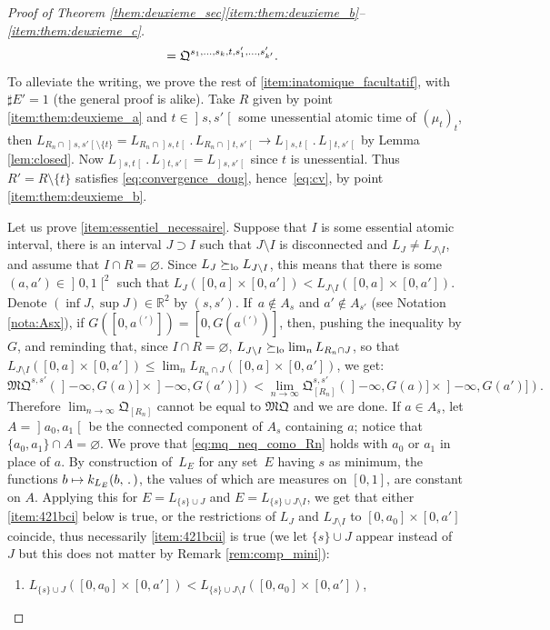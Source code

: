 \documentclass[JEP,XML,SOM,Unicode,NoEqCountersInSection,NoFloatCountersInSection,published]{cedram}
\renewcommand{\theenumi}{\alph{enumi}}
\renewcommand{\theenumii}{\roman{enumii}}
\newenvironment{enumeratei}
{\bgroup\def\theenumi{\roman{enumi}}\def\theenumii{\arabic{enumii}}\begin{enumerate}}
{\end{enumerate}\egroup}
\newcommand{\ldot}{\mathbin{.}}
\newcommand\mto{\mathchoice{\longmapsto}{\mapsto}{\mapsto}{\mapsto}}
\theoremstyle{plain}
\theoremstyle{definition}
\newcommand{\como}{\mathfrak{Q}}
\newcommand{\mq}{\mathfrak{MQ}}
\newcommand{\R}{\mathbb{R}}
\newcommand{\op}{\mathopen}
\newcommand{\clo}{\mathclose}
\newcommand{\geqlc}{\succeq_{\rm lo}}
\begin{document}
\begin{proof}[Proof of Theorem \ref{them:deuxieme_sec}\eqref{item:them:deuxieme_b}--\eqref{item:them:deuxieme_c}]
\begin{align*}
&\hspace*{-5mm}=\como^{s_1,\ldots,s_k,t,s'_1,\ldots,s'_{k'}}.
\end{align*}
To alleviate the writing, we prove the rest of \eqref{item:inatomique_facultatif}, with $\sharp E'=1$ (the general proof is alike). Take $R$ given by point \eqref{item:them:deuxieme_a} and $t\in\op]s,s'\clo[$ some unessential atomic time of $(\mu_t)_t$, then $L_{R_n\cap \op]s,s'\clo[\setminus\{t\}}=L_{R_n\cap \op]s,t\clo[}{}\ldot L_{R_n\cap \op]t,s'\clo[}\to L_{\op]s,t\clo[}{}\ldot L_{\op]t,s'\clo[}$ by Lemma \ref{lem:closed}. Now $L_{\op]s,t\clo[}{}\ldot L_{\op]t,s'\clo[}=L_{\op]s,s'\clo[}$ since $t$ is unessential. Thus $R'=R\setminus\{t\}$ satisfies \eqref{eq:convergence_doug}, hence~\eqref{eq:cv}, by point \eqref{item:them:deuxieme_b}.

Let us prove \eqref{item:essentiel_necessaire}. Suppose that $I$ is some essential atomic interval, \ie there is an interval $J\supset I$ such that $J\setminus I$ is disconnected and $L_{J} \neq L_{J\setminus I}$, and assume that $I\cap R=\varnothing$. Since $L_{J} \geqlc L_{J\setminus I}$, this means that there is some $(a,a')\in\op]0,1\clo[^2$ such that $L_{J}([0,a]\times[0,a'])< L_{J\setminus I}([0,a]\times[0,a'])$. Denote $(\inf J,\sup J)\in\R^2$ by $(s,s')$. If~$a\not\in A_{s}$ and $a'\not\in A_{s'}$ (see Notation \ref{nota:Asx}), \ie if $G([0,a^{(\prime)}])=[0,G(a^{(\prime)})]$, then, pushing the inequality by $G$, and reminding that, since $I\cap R=\varnothing$, $L_{J\setminus I}\geqlc \lim_n L_{R_n\cap J}$, so that $L_{J\setminus I}([0,a]\times[0,a'])\leqslant \lim_n L_{R_n\cap J}([0,a]\times[0,a'])$, we get:\vspace*{-2pt}
\begin{equation}\label{eq:mq_neq_como_Rn}
\mq^{s,s'}(\op]-\infty,G(a)]\times\op]-\infty,G(a')])< \lim_{n\to\infty}\como_{[R_n]}^{s,s'}(\op]-\infty,G(a)]\times\op]-\infty,G(a')]).
\end{equation}
Therefore $ \lim_{n\to\infty}\como_{[R_n]}$ cannot be equal to $\mq$ and we are done. If $a\in A_s$, let $A=\op]a_0,a_1\clo[$ be the connected component of $A_s$ containing $a$; notice that $\{a_0,a_1\}\cap A=\varnothing$. We prove that \eqref{eq:mq_neq_como_Rn} holds with $a_0$ or $a_1$ in place of $a$. By construction of~$L_E$ for any set~$E$ having $s$ as minimum, the functions $b\mto k_{L_E}(b,\,.\,)$, the values of which are measures on $[0,1]$, are constant on $A$. Applying this for $E=L_{\{s\}\cup J}$ and $E=L_{\{s\}\cup J\setminus I}$, we get that either \eqref{item:421bci} below is true, or the restrictions of $L_{ J}$ and $L_{ J\setminus I}$ to $[0,a_0]\times[0,a']$ coincide, thus necessarily \eqref{item:421bcii} is true (we let $\{s\}\cup J$ appear instead of~$J$ but this does not matter by Remark \ref{rem:comp_mini}):
\begin{enumeratei}
\item\label{item:421bci}
$L_{\{s\}\cup J}([0,a_0]\times[0,a'])< L_{\{s\}\cup J\setminus I}([0,a_0]\times[0,a'])$,


\end{enumeratei}
\end{proof}
\end{document}
